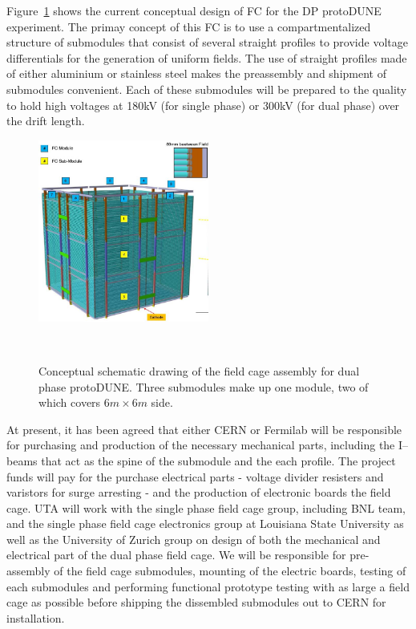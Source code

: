 Figure~\ref{fig:if-dp-fc} shows the current conceptual design of FC for the DP protoDUNE experiment.   The primay concept of this FC is to use a compartmentalized structure of submodules that consist of several straight profiles to provide voltage differentials for the generation of uniform fields. The use of straight profiles made of either aluminium or stainless steel makes the preassembly and shipment of submodules convenient. Each of these submodules will be prepared to the quality to hold high voltages at 180kV (for single phase) or  300kV (for dual phase) over the drift length.  
\begin{figure}[htb]
\centering
\includegraphics[width=0.50\textwidth]{images/if-dp-fc.jpg}
\caption[]{Conceptual schematic drawing of the field cage assembly for dual phase protoDUNE. Three submodules make up one module, two of which covers $6m\times 6m$ side. }
~\label{fig:if-dp-fc}
\end{figure}

At present, it has been agreed that either CERN or Fermilab will be responsible for purchasing and production of the necessary mechanical parts, including the I--beams that act as the spine of the submodule and the each profile.  The project funds will pay for the purchase electrical parts - voltage divider resisters and varistors for surge arresting - and the production of electronic boards the field cage.  UTA will work with the single phase field cage group, including BNL team, and the single phase field cage electronics group at Louisiana State University as well as the University of Zurich group on design of both the mechanical and electrical part of the dual phase field cage.   We will be responsible for pre-assembly of the field cage submodules, mounting of the electric boards, testing of each submodules and performing functional prototype testing with as large a field cage as possible before shipping the dissembled submodules out to CERN for installation.

